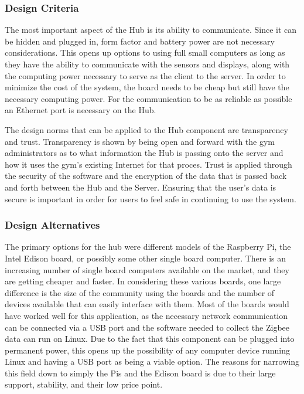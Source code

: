 \documentclass[PPFS.tex]{template/subfiles}
\begin{document}
\subsubsection{Design Criteria}
The most important aspect of the Hub is its ability to communicate. Since it can be hidden and plugged in, form factor and battery power are not necessary considerations. This opens up options to using full small computers as long as they have the ability to communicate with the sensors and displays, along with the computing power necessary to serve as the client to the server. In order to minimize the cost of the system, the board needs to be cheap but still have the necessary computing power. For the communication to be as reliable as possible an Ethernet port is necessary on the Hub.

The design norms that can be applied to the Hub component are transparency and trust. Transparency is shown by being open and forward with the gym administrators as to what information the Hub is passing onto the server and how it uses the gym's existing Internet for that proces. Trust is applied through the security of the software and the encryption of the data that is passed back and forth between the Hub and the Server. Ensuring that the user's data is secure is important in order for users to feel safe in continuing to use the system.

\subsubsection{Design Alternatives}
The primary options for the hub were different models of the Raspberry Pi, the Intel Edison board, or possibly some other single board computer. There is an increasing number of single board computers available on the market, and they are getting cheaper and faster. In considering these various boards, one large difference is the size of the community using the boards and the number of devices available that can easily interface with them. Most of the boards would have worked well for this application, as the necessary network communication can be connected via a USB port and the software needed to collect the Zigbee data can run on Linux. Due to the fact that this component can be plugged into permanent power, this opens up the possibility of any computer device running Linux and having a USB port as being a viable option. The reasons for narrowing this field down to simply the Pis and the Edison board is due to their large support, stability, and their low price point.
\end{document}
